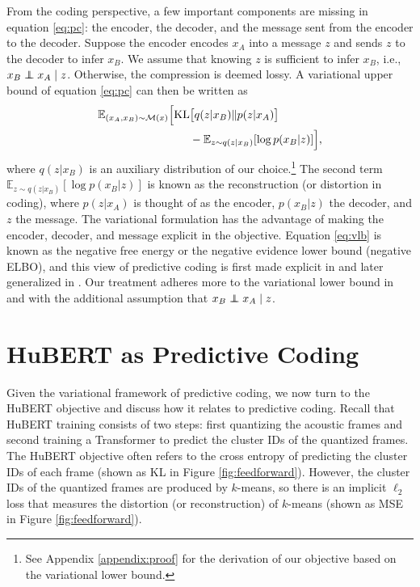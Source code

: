 %
%
%
%
%
%
%
%
%
%
%
%
%
%
%

From the coding perspective,
a few important components are missing in equation \ref{eq:pc}: the encoder, the decoder, and the message sent from the encoder to the decoder.
Suppose the encoder encodes $x_A$ into a message $z$ and sends $z$ to the decoder to infer $x_B$.
We assume that knowing $z$ is sufficient to infer $x_B$, i.e., $x_B \perp\!\!\!\!\perp x_A \mid z$.
Otherwise, the compression is deemed lossy.
A variational upper bound of equation \ref{eq:pc} can then be written as
\begin{align}
  \mathbb{E}_{(x_A, x_B) \sim \mathcal{M}(x)} \Big[ \mathrm{KL} & \big[ q(z|x_B)\|p(z|x_A)\big] \label{eq:vlb} \\
  & - \mathbb{E}_{z \sim q(z|x_B)}[\log p(x_B | z)] \Big], \notag
\end{align}
where $q(z|x_B)$ is an auxiliary distribution of our choice.\footnote{See Appendix \ref{appendix:proof} for the derivation of our objective based on the variational lower bound.} 
The second term $\mathbb{E}_{z \sim q(z|x_B)}[\log p(x_B | z)]$ 
is known as the reconstruction (or distortion in coding),
where $p(z|x_A)$ is thought of as the encoder, $p(x_B | z)$ the decoder, and $z$ the message.
The variational formulation has the advantage of making
the encoder, decoder, and message explicit in the objective.
Equation \ref{eq:vlb} is known as the negative free energy or the negative evidence lower bound (negative ELBO), 
and this view of predictive coding is first made explicit in \citet{friston2009predictive} and later generalized in \citet{feldman2010attention}.
Our treatment adheres more to the variational lower bound in \citet{Kingma2014} and \citet{sohn2015learning} 
with the additional assumption that $x_B \perp\!\!\!\!\perp x_A \mid z$.

%
%
%
%
%
%
%
%
%
%
%
%
%
%
%
%
%
%
%
%
%
%
%
%
%
%
%
%
%
%

%
%
%
%
%
%
%
%
%
%
%
%
%
%
%
%
%
%

%
%
%
%
%
%
%
%
%
%
%
%
%

%
%
%
%

%
%
%
%
%
%
%
%
%
%
%
%
%
%
%
%
%
%
%
%
%
%
%
%
%
%
%
%
%
%
%
%
%
%
%
%
%
%
%
%
%
%

\section{HuBERT as Predictive Coding}
\label{sec:hubert}

Given the variational framework of predictive coding, we now turn to the HuBERT objective and discuss how it relates to predictive coding.
Recall that HuBERT training consists of two steps:
first quantizing the acoustic frames and second training a
Transformer to predict the cluster IDs of the quantized frames.
The HuBERT objective often refers to the cross entropy of predicting
the cluster IDs of each frame (shown as KL in Figure \ref{fig:feedforward}).
However, the cluster IDs of the quantized frames are produced by $k$-means,
so there is an implicit $\ell_2$ loss that measures
the distortion (or reconstruction) of $k$-means
(shown as MSE in Figure \ref{fig:feedforward}).

